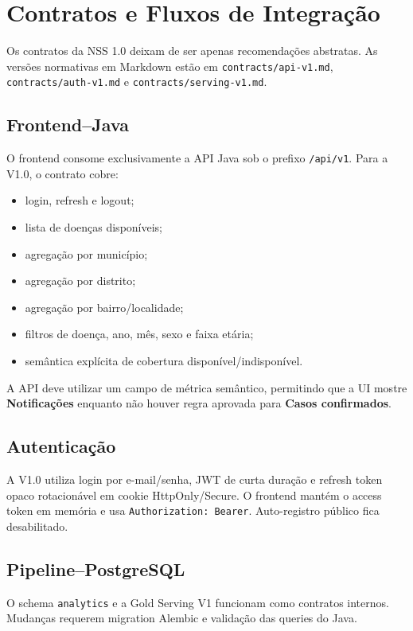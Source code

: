 \section{Contratos e Fluxos de Integração}

Os contratos da NSS 1.0 deixam de ser apenas recomendações abstratas. As versões normativas em Markdown estão em \texttt{contracts/api-v1.md}, \texttt{contracts/auth-v1.md} e \texttt{contracts/serving-v1.md}.

\subsection{Frontend--Java}

O frontend consome exclusivamente a API Java sob o prefixo \texttt{/api/v1}. Para a V1.0, o contrato cobre:

\begin{itemize}
    \item login, refresh e logout;
    \item lista de doenças disponíveis;
    \item agregação por município;
    \item agregação por distrito;
    \item agregação por bairro/localidade;
    \item filtros de doença, ano, mês, sexo e faixa etária;
    \item semântica explícita de cobertura disponível/indisponível.
\end{itemize}

A API deve utilizar um campo de métrica semântico, permitindo que a UI mostre \textbf{Notificações} enquanto não houver regra aprovada para \textbf{Casos confirmados}.

\subsection{Autenticação}

A V1.0 utiliza login por e-mail/senha, JWT de curta duração e refresh token opaco rotacionável em cookie HttpOnly/Secure. O frontend mantém o access token em memória e usa \texttt{Authorization: Bearer}. Auto-registro público fica desabilitado.

\subsection{Pipeline--PostgreSQL}

O schema \texttt{analytics} e a Gold Serving V1 funcionam como contratos internos. Mudanças requerem migration Alembic e validação das queries do Java.

